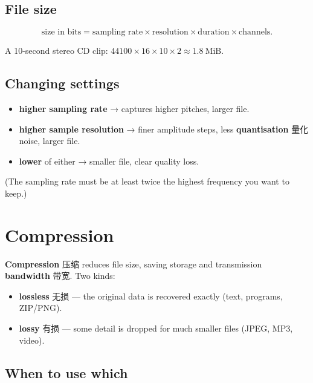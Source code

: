 \documentclass[11pt]{article}
\begin{document}
\subsection*{File size}

\[
\text{size in bits} = \text{sampling rate} \times \text{resolution} \times \text{duration} \times \text{channels}.
\]

A 10-second stereo CD clip: $44100 \times 16 \times 10 \times 2 \approx 1.8\ \text{MiB}$.

\subsection*{Changing settings}

\begin{itemize}
\item \textbf{higher sampling rate} → captures higher pitches, larger file.

\item \textbf{higher sample resolution} → finer amplitude steps, less \textbf{quantisation} 量化 noise, larger file.

\item \textbf{lower} of either → smaller file, clear quality loss.

\end{itemize}

(The sampling rate must be at least twice the highest frequency you want to keep.)

\section*{Compression}

\textbf{Compression} 压缩 reduces file size, saving storage and transmission \textbf{bandwidth} 带宽. Two kinds:

\begin{itemize}
\item \textbf{lossless} 无损 — the original data is recovered exactly (text, programs, ZIP/PNG).

\item \textbf{lossy} 有损 — some detail is dropped for much smaller files (JPEG, MP3, video).

\end{itemize}

\subsection*{When to use which}
\end{document}
